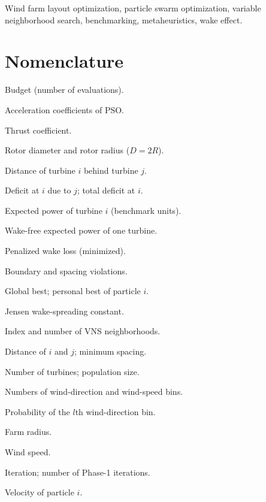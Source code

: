\begin{IEEEkeywords}
Wind farm layout optimization, particle swarm optimization, variable neighborhood search, benchmarking, metaheuristics, wake effect.
\end{IEEEkeywords}

\section*{Nomenclature}
\begin{IEEEdescription}
\item[$B$] Budget (number of evaluations).
\item[$c_1$, $c_2$] Acceleration coefficients of PSO.
\item[$C_T$] Thrust coefficient.
\item[$D$, $R$] Rotor diameter and rotor radius ($D=2R$).
\item[$d_{ij}$] Distance of turbine $i$ behind turbine $j$.
\item[$\Delta_{ij}$, $\Delta_i$] Deficit at $i$ due to $j$; total deficit at $i$.
\item[$E(P_i)$] Expected power of turbine $i$ (benchmark units).
\item[$E_{\rm ideal}$] Wake-free expected power of one turbine.
\item[$F_p$] Penalized wake loss (minimized).
\item[$g^{\rm b}_i$, $g^{\rm s}_{ij}$] Boundary and spacing violations.
\item[$\mathbf G$, $\mathbf P^i$] Global best; personal best of particle $i$.
\item[$K$] Jensen wake-spreading constant.
\item[$k$, $k_{\max}$] Index and number of VNS neighborhoods.
\item[$\ell_{ij}$, $\ell_{\min}$] Distance of $i$ and $j$; minimum spacing.
\item[$N$, $N_p$] Number of turbines; population size.
\item[$N_\theta$, $N_s$] Numbers of wind-direction and wind-speed bins.
\item[$p_l$] Probability of the $l$th wind-direction bin.
\item[$r$] Farm radius.
\item[$s$] Wind speed.
\item[$t$, $T_1$] Iteration; number of Phase-1 iterations.
\item[$\mathbf V^i$] Velocity of particle $i$.

\end{IEEEdescription}

